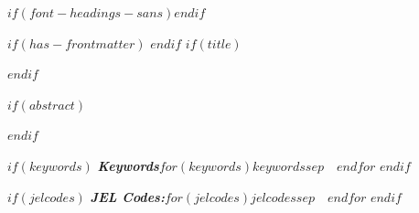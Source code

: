 $if(font-headings-sans)$\allsectionsfont{\sffamily}$endif$

$if(has-frontmatter)$
\frontmatter
$endif$
$if(title)$
\maketitle
$endif$

$if(abstract)$
\begin{abstract}
$abstract$
\end{abstract}
$endif$

$if(keywords)$
\textbf{\textit{Keywords}}\quad $for(keywords)$$keywords$$sep$~\textbullet~$endfor$
$endif$

$if(jelcodes)$
\textbf{\textit{JEL Codes:}}\quad $for(jelcodes)$$jelcodes$$sep$~\textbullet~$endfor$
$endif$


\clearpage